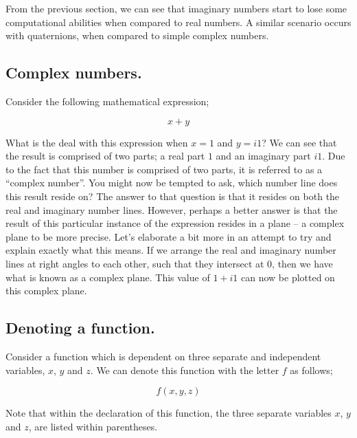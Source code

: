\documentclass{article}
\begin{document}
From the previous section, we can see that imaginary numbers start to lose some computational abilities when
compared to real numbers. A similar scenario occurs with quaternions, when compared to simple complex numbers. 


\subsection{Complex numbers.}

Consider the following mathematical expression;

\begin{equation*}
x + y
\end{equation*}

What is the deal with this expression when $x=1$ and $y=i1$? We can see that the result is comprised of two
parts; a real part $1$ and an imaginary part $i1$. Due to the fact that this number is comprised of two parts, it is
referred to as a ``complex number''. You might now be tempted to ask, which number line does this result reside on? The
answer to that question is that it resides on both the real and imaginary number lines. However, perhaps a better
answer is that
the result of this particular instance of the expression resides in a plane -- a complex plane to be more precise.
Let's elaborate a bit more in an attempt to try and explain exactly what this means. If we arrange the real and imaginary number
lines at right angles to each other, such that they intersect at 0, then we have what is known as a complex plane.
This value of $1 + i1$ can now be plotted on this complex plane.


\subsection{Denoting a function.}

Consider a function which is dependent on three separate and independent variables, \begin{math} x\end{math}, $y$ and 
\begin{math} z\end{math}. We can denote this function with the letter \begin{math} f \end{math} as follows;

\begin{equation*}
  f(x, y, z)
\end{equation*}

Note that within the declaration of this function, the three separate variables \begin{math} x\end{math}, 
\begin{math}y\end{math} and \begin{math} z\end{math}, are listed within parentheses.\\
\end{document}
